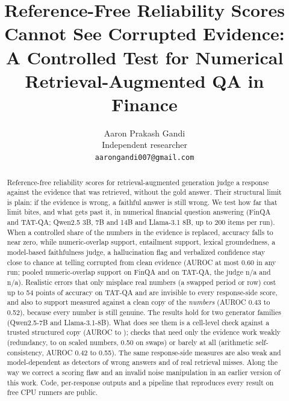 \documentclass[11pt]{article}
\title{Reference-Free Reliability Scores Cannot See Corrupted Evidence:\\
A Controlled Test for Numerical Retrieval-Augmented QA in Finance}
\author{Aaron Prakash Gandi \\
  Independent researcher \\
  \texttt{aarongandi007@gmail.com}}
\providecommand{\aucFinjudge}{n/a}\providecommand{\aucTatjudge}{n/a}
\begin{document}
\maketitle

\begin{abstract}
Reference-free reliability scores for retrieval-augmented generation judge a response against the evidence that was retrieved, without the gold answer. Their structural limit is plain: if the evidence is wrong, a faithful answer is still wrong. We test how far that limit bites, and what gets past it, in numerical financial question answering (FinQA and TAT-QA; Qwen2.5 3B, 7B and 14B and Llama-3.1 8B, up to 200 items per run).
When a controlled share of the numbers in the evidence is replaced, accuracy falls to near zero, while numeric-overlap support, entailment support, lexical groundedness, a model-based faithfulness judge, a hallucination flag and verbalized confidence stay close to chance at telling corrupted from clean evidence (AUROC at most 0.60 in any run; pooled numeric-overlap support \aucFinoverlap{} on FinQA and \aucTatoverlap{} on TAT-QA, the judge \aucFinjudge{} and \aucTatjudge{}).
Realistic errors that only misplace real numbers (a swapped period or row) cost up to 54 points of accuracy on TAT-QA and are invisible to every response-side score, and also to support measured against a clean copy of the \emph{numbers} (AUROC 0.43 to 0.52), because every number is still genuine. The results hold for two generator families (Qwen2.5-7B and Llama-3.1-8B).
What does see them is a cell-level check against a trusted structured copy (AUROC \evPairFinPeriod{} to \evPairTatRow{}); checks that need only the evidence work weakly (redundancy, \evRedFinScaled{} to \evRedTatScaled{} on scaled numbers, 0.50 on swaps) or barely at all (arithmetic self-consistency, AUROC 0.42 to 0.55).
The same response-side measures are also weak and model-dependent as detectors of wrong answers and of real retrieval misses.
Along the way we correct a scoring flaw and an invalid noise manipulation in an earlier version of this work.
Code, per-response outputs and a pipeline that reproduces every result on free CPU runners are public.
\end{abstract}






\end{document}
